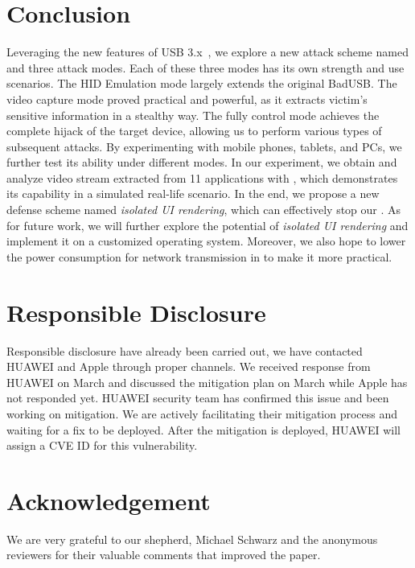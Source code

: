 \section{Conclusion}
\label{sec:conclusion}

Leveraging the new features of \ac{USB} 3.x~\cite{usb30,usb31,usb32}, we explore a
new attack scheme named \tool and three attack modes. Each of these three modes
has its own strength and use scenarios. The \ac{HID} Emulation mode largely extends the
original BadUSB. The video capture mode proved practical and powerful, as it extracts
victim's sensitive information in a stealthy way. The fully control mode
achieves the complete hijack of the target device, allowing us to perform various
types of subsequent attacks. By experimenting \tool with mobile phones, tablets,
and PCs, we further test its ability under different modes. In our experiment, we
obtain and analyze video stream extracted from 11 applications with \tool,
which demonstrates its capability in a simulated real-life scenario. In the end, we
propose a new defense scheme named \textit{isolated UI rendering}, which can
effectively stop our \tool.
As for future work, we will further explore the potential of \textit{isolated UI
rendering} and implement it on a customized operating system. Moreover, we also
hope to lower the power consumption for network transmission in \tool to make
it more practical.

\section{Responsible Disclosure}
Responsible disclosure have already been carried out, we have contacted HUAWEI and Apple through proper channels. We received response from HUAWEI on March  and discussed the mitigation plan on March  while Apple has not responded yet. HUAWEI security team has confirmed this issue and been working on mitigation. We are actively facilitating their mitigation process and waiting for a fix to be deployed. After the mitigation is deployed, HUAWEI will assign a CVE ID for this vulnerability.

\section{Acknowledgement}
We are very grateful to our shepherd, Michael Schwarz and the anonymous reviewers for their valuable comments that improved the paper.